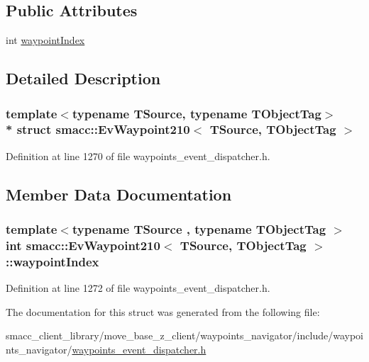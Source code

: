 \subsection*{Public Attributes}
\begin{DoxyCompactItemize}
\item 
int \hyperlink{structsmacc_1_1EvWaypoint210_ad3a837d3b09e80c260ffc989286dc092}{waypoint\+Index}
\end{DoxyCompactItemize}


\subsection{Detailed Description}
\subsubsection*{template$<$typename T\+Source, typename T\+Object\+Tag$>$\\*
struct smacc\+::\+Ev\+Waypoint210$<$ T\+Source, T\+Object\+Tag $>$}



Definition at line 1270 of file waypoints\+\_\+event\+\_\+dispatcher.\+h.



\subsection{Member Data Documentation}
\subsubsection[{\texorpdfstring{waypoint\+Index}{waypointIndex}}]{\setlength{\rightskip}{0pt plus 5cm}template$<$typename T\+Source , typename T\+Object\+Tag $>$ int {\bf smacc\+::\+Ev\+Waypoint210}$<$ T\+Source, T\+Object\+Tag $>$\+::waypoint\+Index}\hypertarget{structsmacc_1_1EvWaypoint210_ad3a837d3b09e80c260ffc989286dc092}{}\label{structsmacc_1_1EvWaypoint210_ad3a837d3b09e80c260ffc989286dc092}


Definition at line 1272 of file waypoints\+\_\+event\+\_\+dispatcher.\+h.



The documentation for this struct was generated from the following file\+:\begin{DoxyCompactItemize}
\item 
smacc\+\_\+client\+\_\+library/move\+\_\+base\+\_\+z\+\_\+client/waypoints\+\_\+navigator/include/waypoints\+\_\+navigator/\hyperlink{waypoints__event__dispatcher_8h}{waypoints\+\_\+event\+\_\+dispatcher.\+h}\end{DoxyCompactItemize}
